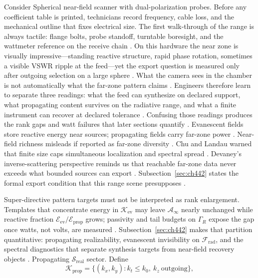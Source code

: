 \begin{physicalvignette}
Consider Spherical near-field scanner with dual-polarization probes. Before any coefficient table is printed, technicians record frequency, cable loss, and the mechanical outline that fixes electrical size. The first walk-through of the range is always tactile: flange bolts, probe standoff, turntable boresight, and the wattmeter reference on the receive chain \cite{hansen1988}.
On this hardware the near zone is visually impressive---standing reactive structure, rapid phase rotation, sometimes a visible VSWR ripple at the feed---yet the export question is measured only after outgoing selection on a large sphere \cite{harrington2001}. What the camera sees in the chamber is not automatically what the far-zone pattern claims \cite{stratton1941}.
Engineers therefore learn to separate three readings: what the feed can synthesize on declared support, what propagating content survives on the radiative range, and what a finite instrument can recover at declared tolerance \cite{devaney2004}. Confusing those readings produces the rank gaps and watt failures that later sections quantify \cite{pal2026}.
Evanescent fields store reactive energy near sources; propagating fields carry far-zone power . Near-field richness misleads if reported as far-zone diversity .
Chu and Landau warned that finite size caps simultaneous localization and spectral spread \cite{chu1948}. Devaney's inverse-scattering perspective reminds us that reachable far-zone data never exceeds what bounded sources can export \cite{devaney2004}.
Subsection~\ref{sec:ch442} states the formal export condition that this range scene presupposes \cite{stratton1941}.
\end{physicalvignette}
Super-directive pattern targets must not be interpreted as rank enlargement. Templates that concentrate energy in $\mathcal{K}_{\mathrm{ev}}$ may leave $\mathcal{A}_\infty$ nearly unchanged while reactive fraction $\mathcal{E}_{\mathrm{ev}}/\mathcal{E}_{\mathrm{prop}}$ grows; passivity and tail budgets on $\Gamma_R$ expose the gap once watts, not volts, are measured \cite{stratton1941}. Subsection~\ref{sec:ch442} makes that partition quantitative: propagating realizability, evanescent invisibility on $\mathcal{F}_{\mathrm{rad}}$, and the spectral diagnostics that separate synthesis targets from near-field recovery objects \cite{devaney2004}.
Propagating $\mathcal{S}_{\mathrm{real}}$ sector. Define
\begin{equation}
\label{eq:ch4.propagating-sector}
\mathcal{K}_{\mathrm{prop}}
=
\{(k_{x},k_{y}):k_{t}\le k_{0},\ k_{z}\ \text{outgoing}\},
\end{equation}
